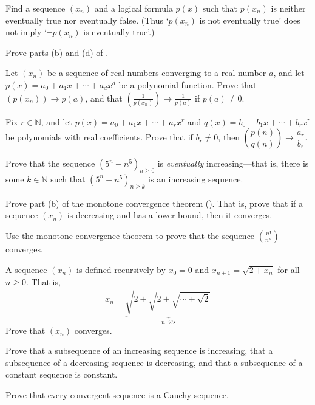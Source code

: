 \begin{exercise}
Find a sequence $(x_n)$ and a logical formula $p(x)$ such that $p(x_n)$ is neither eventually true nor eventually false. (Thus `$p(x_n)$ is not eventually true' does not imply `$\neg p(x_n)$ is eventually true'.)
\end{exercise}

\begin{exercise}
Prove parts (b) and (d) of .
\end{exercise}

\begin{exercise}
\label{exPolynomialsAreContinuousUsingSequences}
Let $(x_n)$ be a sequence of real numbers converging to a real number $a$, and let $p(x) = a_0 + a_1x + \cdots + a_d x^d$ be a polynomial function. Prove that $(p(x_n)) \to p(a)$, and that $\left( \frac{1}{p(x_n)} \right) \to \frac{1}{p(a)}$ if $p(a) \ne 0$.
\end{exercise}

\begin{exercise}
Fix $r \in \mathbb{N}$, and let $p(x) = a_0 + a_1 x + \cdots + a_r x^r$ and $q(x) = b_0 + b_1 x + \cdots + b_r x^r$ be polynomials with real coefficients. Prove that if $b_r \ne 0$, then $\left( \dfrac{p(n)}{q(n)} \right) \to \dfrac{a_r}{b_r}$.
\end{exercise}

\begin{exercise}
Prove that the sequence $(5^n-n^5)_{n \ge 0}$ is \textit{eventually} increasing---that is, there is some $k \in \mathbb{N}$ such that $(5^n-n^5)_{n \ge k}$ is an increasing sequence.
\end{exercise}

\begin{exercise}
\label{exMonotoneConvergenceForDecreasingSequences}
Prove part (b) of the monotone convergence theorem (). That is, prove that if a sequence $(x_n)$ is decreasing and has a lower bound, then it converges.
\end{exercise}


\begin{exercise}
Use the monotone convergence theorem to prove that the sequence $\left( \frac{n!}{n^n} \right)$ converges.
\end{exercise}

\begin{exercise}
A sequence $(x_n)$ is defined recursively by $x_0 = 0$ and $x_{n+1} = \sqrt{2+x_n}$ for all $n \ge 0$. That is,
\[ x_n = \underbrace{\sqrt{2 + \sqrt{2 + \sqrt{ \cdots + \sqrt{2}}}}}_{n \text{ `2's}} \]
Prove that $(x_n)$ converges.
\end{exercise}

\begin{exercise}
Prove that a subsequence of an increasing sequence is increasing, that a subsequence of a decreasing sequence is decreasing, and that a subsequence of a constant sequence is constant.
\end{exercise}

\begin{exercise}
Prove that every convergent sequence is a Cauchy sequence.
\end{exercise}
